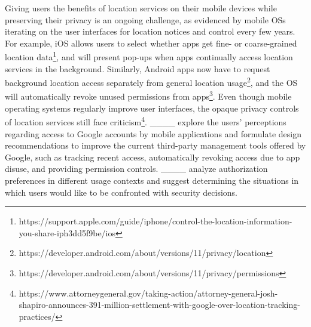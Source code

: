 Giving users the benefits of location services on their mobile devices while preserving their privacy is an ongoing challenge, as evidenced by mobile OSs iterating on the user interfaces for location notices and control every few years.
For example, iOS allows users to select whether apps get fine- or coarse-grained location data\footnote{https://support.apple.com/guide/iphone/control-the-location-information-you-share-iph3dd5f9be/ios}, and will
present pop-ups when apps continually access location services in the background.
Similarly, Android apps now have to request background location access separately from general location usage\footnote{https://developer.android.com/about/versions/11/privacy/location},
and the OS
 will automatically revoke unused permissions from apps\footnote{https://developer.android.com/about/versions/11/privacy/permissions}. 
Even though mobile operating systems regularly improve user interfaces, the opaque privacy controls of location services still face criticism\footnote{https://www.attorneygeneral.gov/taking-action/attorney-general-josh-shapiro-announces-391-million-settlement-with-google-over-location-tracking-practices/}.
____ explore the users' perceptions regarding access to Google accounts by mobile applications and formulate design recommendations to improve the current third-party management tools offered by Google, such as tracking recent access, automatically revoking access due to app disuse, and providing permission controls.
____ analyze authorization preferences in different usage contexts and suggest determining the situations in which users would like to be confronted with security decisions.








